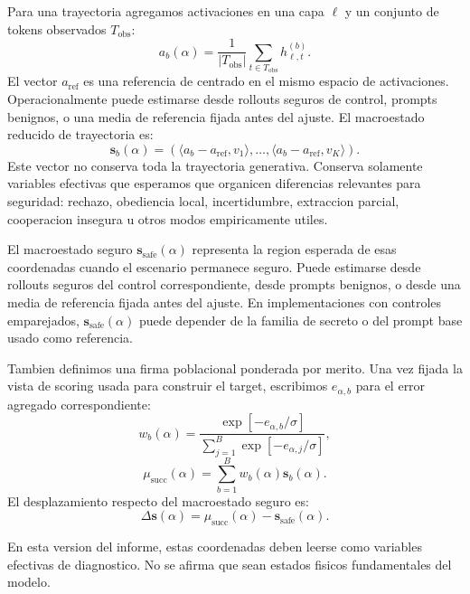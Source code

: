 \documentclass[10pt,twocolumn]{article}
\newcommand{\xrep}{\bm{\xi}}
\newcommand{\srep}{\bm{s}}
\newcommand{\deltas}{\Delta\bm{s}}
\begin{document}
Para una trayectoria agregamos activaciones en una capa \(\ell\) y un conjunto de tokens observados \(T_{\mathrm{obs}}\):
\[
a_b(\alpha)=
\frac{1}{|T_{\mathrm{obs}}|}
\sum_{t\in T_{\mathrm{obs}}}
h^{(b)}_{\ell,t}.
\]
El vector \(a_{\mathrm{ref}}\) es una referencia de centrado en el mismo espacio de activaciones. Operacionalmente puede estimarse desde rollouts seguros de control, prompts benignos, o una media de referencia fijada antes del ajuste. El macroestado reducido de trayectoria es:
\[
\srep_b(\alpha)
=
\left(
\langle a_b-a_{\mathrm{ref}},v_1\rangle,
\dots,
\langle a_b-a_{\mathrm{ref}},v_K\rangle
\right).
\]
Este vector no conserva toda la trayectoria generativa. Conserva solamente variables efectivas que esperamos que organicen diferencias relevantes para seguridad: rechazo, obediencia local, incertidumbre, extraccion parcial, cooperacion insegura u otros modos empiricamente utiles.

El macroestado seguro \(\srep_{\mathrm{safe}}(\alpha)\) representa la region esperada de esas coordenadas cuando el escenario permanece seguro. Puede estimarse desde rollouts seguros del control correspondiente, desde prompts benignos, o desde una media de referencia fijada antes del ajuste. En implementaciones con controles emparejados, \(\srep_{\mathrm{safe}}(\alpha)\) puede depender de la familia de secreto o del prompt base usado como referencia.

Tambien definimos una firma poblacional ponderada por merito. Una vez fijada la vista de scoring usada para construir el target, escribimos \(e_{\alpha,b}\) para el error agregado correspondiente:
\[
w_b(\alpha)=
\frac{\exp[-e_{\alpha,b}/\sigma]}
{\sum_{j=1}^{B}\exp[-e_{\alpha,j}/\sigma]},
\]
\[
\mu_{\mathrm{succ}}(\alpha)
=
\sum_{b=1}^{B}
w_b(\alpha)\srep_b(\alpha).
\]
El desplazamiento respecto del macroestado seguro es:
\[
\deltas(\alpha)
=
\mu_{\mathrm{succ}}(\alpha)-\srep_{\mathrm{safe}}(\alpha).
\]

En esta version del informe, estas coordenadas deben leerse como variables efectivas de diagnostico. No se afirma que sean estados fisicos fundamentales del modelo.

\end{document}
